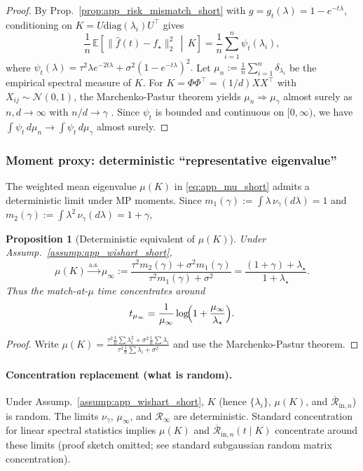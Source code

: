 \documentclass{article}
\theoremstyle{plain}
\newtheorem{proposition}[theorem]{Proposition}
\theoremstyle{definition}
\theoremstyle{remark}
\begin{document}
\begin{proof}
By Prop.~\ref{prop:app_risk_mismatch_short} with $g=g_t(\lambda)=1-e^{-t\lambda}$, conditioning on
$K=U\mathrm{diag}(\lambda_i)U^\top$ gives
\[
\frac1n\,\mathbb{E}\!\left[\|\hat f(t)-f_\star\|_2^2 \,\middle|\, K\right]
=
\frac1n\sum_{i=1}^n \psi_t(\lambda_i),
\]
where $\psi_t(\lambda)=\tau^2\lambda e^{-2t\lambda}+\sigma^2(1-e^{-t\lambda})^2.$
Let $\mu_n:=\frac1n\sum_{i=1}^n \delta_{\lambda_i}$ be the empirical spectral measure of $K$.
For $K=\Phi\Phi^\top=(1/d)XX^\top$ with $X_{ij}\sim\mathcal N(0,1)$, the Marchenko-Pastur theorem yields $\mu_n\Rightarrow \mu_\gamma$ almost surely as $n,d\to\infty$ with $n/d\to\gamma$
\citep{MarchenkoPastur1967,BaiSilverstein2010}.
Since $\psi_t$ is bounded and continuous on $[0,\infty)$, we have
$\int \psi_t\,d\mu_n \to \int \psi_t\,d\mu_\gamma$ almost surely.
\end{proof}


\subsubsection{Moment proxy: deterministic ``representative eigenvalue''}
The weighted mean eigenvalue $\mu(K)$ in \eqref{eq:app_mu_short} admits a deterministic limit under MP moments.
Since $m_1(\gamma):=\int \lambda\,\nu_\gamma(d\lambda)=1$ and $m_2(\gamma):=\int \lambda^2\,\nu_\gamma(d\lambda)=1+\gamma$,
\begin{proposition}[Deterministic equivalent of $\mu(K)$]\label{prop:app_mu_limit_short}
Under Assump.~\ref{assump:app_wishart_short},
\begin{equation}
\mu(K)\xrightarrow{\mathrm{a.s.}}\mu_\infty
:=
\frac{\tau^2 m_2(\gamma)+\sigma^2 m_1(\gamma)}{\tau^2 m_1(\gamma)+\sigma^2}
=
\frac{(1+\gamma)+\lambda_\star}{1+\lambda_\star}.
\label{eq:app_mu_infty_short}
\end{equation}
Thus the match-at-$\mu$ time concentrates around
\begin{equation}
t_{\mu_\infty}
=
\frac{1}{\mu_\infty}\log\!\Bigl(1+\frac{\mu_\infty}{\lambda_\star}\Bigr).
\label{eq:app_t_mu_infty_short}
\end{equation}
\end{proposition}
\begin{proof}
Write $\mu(K)=\frac{\tau^2\frac1n\sum\lambda_i^2+\sigma^2\frac1n\sum\lambda_i}{\tau^2\frac1n\sum\lambda_i+\sigma^2}$ and use the Marchenko-Pastur theorem.
\end{proof}

\paragraph{Concentration replacement (what is random).}
Under Assump.~\ref{assump:app_wishart_short}, $K$ (hence $\{\lambda_i\}$, $\mu(K)$, and $\overline{\mathcal{R}}_{\mathrm{in},n}$) is random.
The limits $\nu_\gamma$, $\mu_\infty$, and $\mathcal{R}_\infty$ are deterministic. Standard concentration for linear spectral statistics implies $\mu(K)$ and $\overline{\mathcal{R}}_{\mathrm{in},n}(t\mid K)$ concentrate around these limits (proof sketch omitted; see standard subgaussian random matrix concentration).
\end{document}
